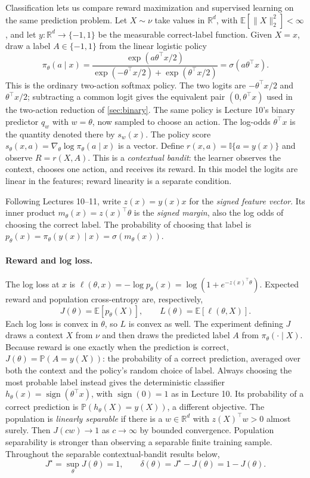 \documentclass[11pt,twoside]{article}
\newcommand{\E}{\mathbb E}
\newcommand{\I}{\mathbb I}
\renewcommand{\P}{\mathbb P}
\newcommand{\R}{\mathbb R}
\theoremstyle{definition}
\theoremstyle{remark}
\begin{document}
Classification lets us compare reward maximization and supervised learning
on the same prediction problem. Let $X\sim\nu$ take values in $\R^d$,
with $\E[\|X\|_2^2]<\infty$, and let $y:\R^d\to\{-1,1\}$ be the
measurable correct-label function. Given $X=x$, draw a label $A\in\{-1,1\}$ from
the linear logistic policy
\[
 \pi_\theta(a\mid x)
 =\frac{\exp(a\theta^\top x/2)}
 {\exp(-\theta^\top x/2)+\exp(\theta^\top x/2)}
 =\sigma(a\theta^\top x).
\]
This is the ordinary two-action softmax policy. The two logits are
$-\theta^\top x/2$ and $\theta^\top x/2$; subtracting a common logit gives
the equivalent pair $(0,\theta^\top x)$ used in the two-action reduction of
\cref{sec:binary}. The same policy is Lecture 10's binary predictor $q_w$
with $w=\theta$, now sampled to choose an action. The log-odds
$\theta^\top x$ is the quantity denoted there by $s_w(x)$. The policy score
$s_\theta(x,a)=\nabla_\theta\log\pi_\theta(a\mid x)$ is a vector.
Define $r(x,a)=\I\{a=y(x)\}$ and observe $R=r(X,A)$.
This is a \emph{contextual bandit}:
the learner observes the context, chooses one action, and receives its
reward. In this model the logits are linear in the features; reward
linearity is a separate condition.

Following Lectures 10--11, write $z(x)=y(x)x$ for the
\emph{signed feature vector}. Its inner product
$m_\theta(x)=z(x)^\top\theta$ is the \emph{signed margin}, also the
log odds of choosing the correct label. The probability of choosing that
label is $p_\theta(x)=\pi_\theta(y(x)\mid x)=\sigma(m_\theta(x))$.

\paragraph{Reward and log loss.}
The log loss at $x$ is
$\ell(\theta,x)=-\log p_\theta(x)=\log(1+e^{-z(x)^\top\theta})$.
Expected reward and population cross-entropy are, respectively,
\begin{equation}
 J(\theta)=\E[p_\theta(X)],
 \qquad L(\theta)=\E[\ell(\theta,X)].
 \label{eq:classification-objectives}
\end{equation}
Each log loss is convex in $\theta$, so $L$ is convex as well.
The experiment defining $J$ draws a context $X$ from $\nu$ and then
draws the predicted label $A$ from $\pi_\theta(\cdot\mid X)$.
Because reward is one exactly when the prediction is correct,
$J(\theta)=\P(A=y(X))$: the probability of a correct prediction,
averaged over both the context and the policy's random choice of label.
Always choosing the most probable label instead gives the deterministic
classifier $h_\theta(x)=\operatorname{sign}(\theta^\top x)$, with
$\operatorname{sign}(0)=1$ as in Lecture 10. Its probability of a correct
prediction is $\P(h_\theta(X)=y(X))$, a different objective.
The population is \emph{linearly separable} if
there is a $w\in\R^d$ with $z(X)^\top w>0$ almost surely.
Then $J(cw)\to1$ as $c\to\infty$ by bounded convergence. Population
separability is stronger than observing a separable finite training sample.
Throughout the separable contextual-bandit results below,
\[
 J^\star=\sup_\theta J(\theta)=1,
 \qquad \delta(\theta)=J^\star-J(\theta)=1-J(\theta).
\]
\end{document}
